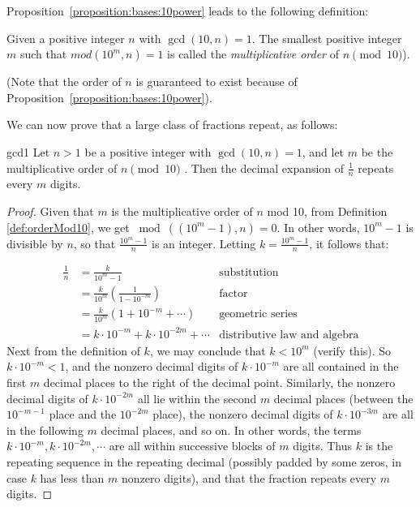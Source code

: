 Proposition~\ref{proposition:bases:10power} leads to the following definition:

\begin{defn}\label{def:orderMod10}
Given a positive integer $n$ with $\gcd(10,n)=1$. The smallest positive integer $m$ such that $mod(10^{m},n)=1$  is called the \textit{multiplicative order} of $n \pmod{10}$).\\
\noindent

(Note that the order of $n$ is guaranteed to exist because of Proposition~\ref{proposition:bases:10power}).
\end{defn}
\noindent

We can now prove that a large class of fractions  repeat, as follows:

\begin{prop}{gcd1}
Let $n>1$ be a positive integer with $\gcd(10,n)=1$, and let $m$ be the multiplicative order of $n \pmod{10}$ . Then the decimal expansion of $\frac{1}{n}$ repeats every $m$ digits.
\end{prop}

\begin{proof}
Given that $m$ is the multiplicative order of $n$ mod 10, from Definition \ref{def:orderMod10}, we get $\bmod((10^{m}-1),n)=0$. In other words, $10^{m}-1$ is divisible by $n$, so that $\frac{10^{m}-1}{n}$ is an integer. Letting $k=\frac{10^{m}-1}{n}$,  it follows that:

\begin{align*}
\frac{1}{n}&=\frac{k}{10^{m}-1} & \text{substitution}\\
&=\frac{k}{10^{m}}\left(\frac{1}{1-10^{-m}}\right) & \text{factor}\\
&=\frac{k}{10^{m}}\left(1+10^{-m}+\cdots\right) &\text{geometric series}\\
&=k \cdot 10^{-m}+ k \cdot 10^{-2m}+\cdots  &\text{distributive law and algebra}
\end{align*}
Next from the definition of $k$, we may conclude that $k < 10^m$ (verify this). So $k\cdot 10^{-m}<1$, and  the nonzero decimal digits of $k\cdot 10^{-m}$ are all contained in the first $m$ decimal places to the right of the decimal point. Similarly, the nonzero decimal digits of $k\cdot 10^{-2m}$ all lie within the second $m$ decimal places (between the $10^{-m-1}$ place and the $10^{-2m}$ place), the  nonzero decimal digits of $k\cdot 10^{-3m}$ are all in the following $m$ decimal places, and so on. In other words,  the terms $k \cdot 10^{-m},  k \cdot 10^{-2m}, \cdots$ are all within successive blocks of $m$  digits.
Thus  $k$ is the repeating sequence in the repeating decimal (possibly padded by some zeros, in case $k$ has less than $m$ nonzero digits), and that the fraction repeats every $m$ digits.
\end{proof}

